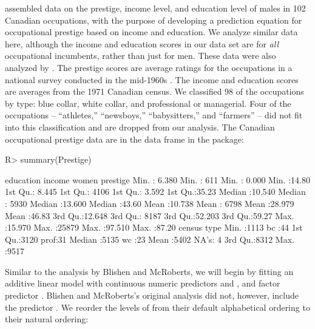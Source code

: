 \documentclass[article]{jss}
\begin{document}
\citet{BlishenMcRoberts76} assembled data on the prestige, income
level, and education level of males in 102 Canadian occupations, with
the purpose of developing a prediction equation for occupational
prestige based on income and education. We analyze similar data here,
although the income and education scores in our data set are for
\emph{all} occupational incumbents, rather than just for men. These
data were also analyzed by \citet{FoxSuschnigg89}. The prestige scores
are average ratings for the occupations in a national survey conducted
in the mid-1960s \citep{PineoPorter67}. The income and education
scores are averages from the 1971 Canadian census. We classified 98 of
the occupations by type: blue collar, white collar, and professional
or managerial. Four of the occupations -- ``athletes,'' ``newsboys,''
``babysitters,'' and ``farmers'' -- did not fit into this
classification and are dropped from our analysis. The Canadian
occupational prestige data are in the data frame  in
the  package:
%
\begin{Schunk}
\begin{Sinput}
R> summary(Prestige)
\end{Sinput}
\begin{Soutput}
   education          income          women           prestige    
 Min.   : 6.380   Min.   :  611   Min.   : 0.000   Min.   :14.80  
 1st Qu.: 8.445   1st Qu.: 4106   1st Qu.: 3.592   1st Qu.:35.23  
 Median :10.540   Median : 5930   Median :13.600   Median :43.60  
 Mean   :10.738   Mean   : 6798   Mean   :28.979   Mean   :46.83  
 3rd Qu.:12.648   3rd Qu.: 8187   3rd Qu.:52.203   3rd Qu.:59.27  
 Max.   :15.970   Max.   :25879   Max.   :97.510   Max.   :87.20  
     census       type   
 Min.   :1113   bc  :44  
 1st Qu.:3120   prof:31  
 Median :5135   wc  :23  
 Mean   :5402   NA's: 4  
 3rd Qu.:8312            
 Max.   :9517            
\end{Soutput}
\end{Schunk}
%
Similar to the analysis by Blishen and McRoberts, we will begin by
fitting an additive linear model with continuous numeric predictors
 and , and factor predictor
. Blishen and McRoberts's original analysis did not,
however, include the predictor . We reorder the levels of
 from their default alphabetical ordering to their natural
ordering:
%
\end{document}
